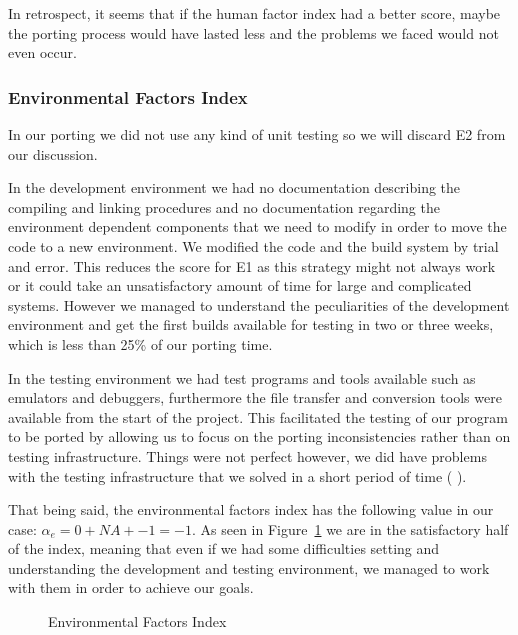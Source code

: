In retrospect, it seems that if the human factor index had a better score, maybe
the porting process would have lasted less and the problems we faced would not
even occur. 

\subsubsection{Environmental Factors Index}

In our porting we did not use any kind of unit testing so we will discard E2
from our discussion.

In the development environment we had no documentation describing the compiling
and linking procedures and no documentation regarding the environment dependent
components that we need to modify in order to move the code to a new
environment. We modified the code and the build system by trial and error. This
reduces the score for E1 as this strategy might not always work or it could take
an unsatisfactory amount of time for large and complicated systems. However
we managed to understand the peculiarities of the development environment and
get the first builds available for testing in two or three weeks, which is less
than 25\% of our porting time.

In the testing environment we had test programs and tools available such as
emulators and debuggers, furthermore the file transfer and conversion tools
were available from the start of the project. This facilitated the testing of
our program to be ported by allowing us to focus on the porting inconsistencies
rather than on testing infrastructure. Things were not perfect however, we did
have problems with the testing infrastructure that we solved in a short period
of time ( ).

That being said, the environmental factors index has the following value in our
case:  $\alpha_e = 0 + NA + -1 = -1$. As seen in Figure~\ref{fig:EFI} we are in the
satisfactory half of the index, meaning that even if we had some difficulties
setting and understanding the development and testing environment, we managed
to work with them in order to achieve our goals.

\begin{figure}

    \caption{Environmental Factors Index }
    \label{fig:EFI}
\end{figure}

